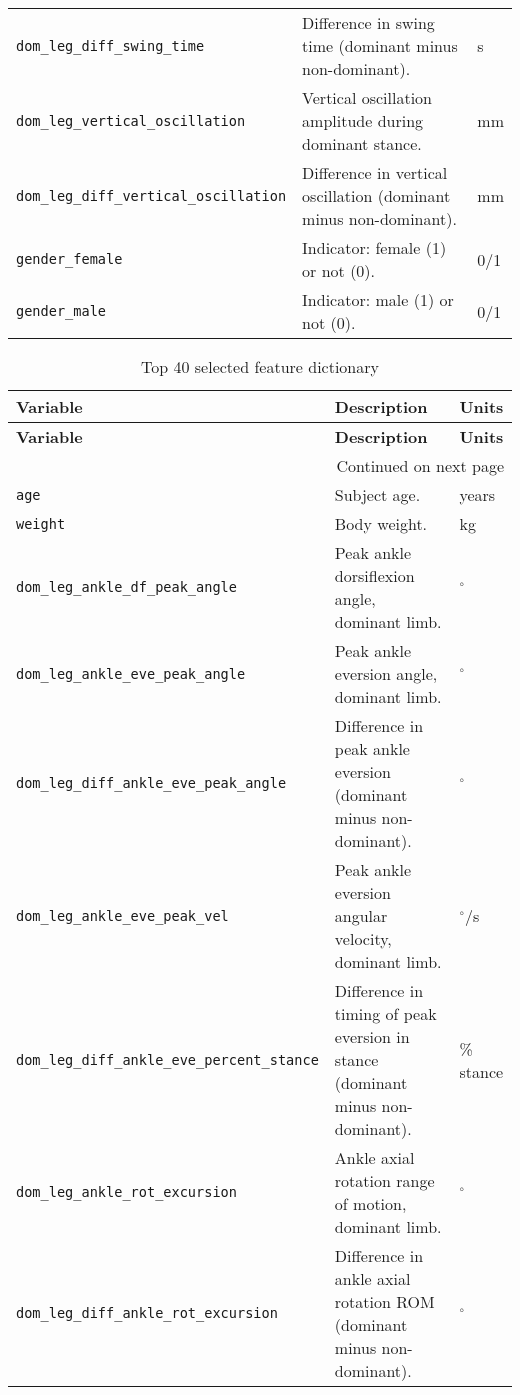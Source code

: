 \begin{longtable}{@{}l p{} l@{}}
    \texttt{dom\_leg\_diff\_swing\_time} & Difference in swing time (dominant minus non-dominant). & s \\
    \texttt{dom\_leg\_vertical\_oscillation} & Vertical oscillation amplitude during dominant stance. & mm \\
    \texttt{dom\_leg\_diff\_vertical\_oscillation} & Difference in vertical oscillation (dominant minus non-dominant). & mm \\
    \texttt{gender\_female} & Indicator: female (1) or not (0). & 0/1 \\
    \texttt{gender\_male} & Indicator: male (1) or not (0). & 0/1 \\
\end{longtable}


\begin{longtable}{@{}l p{} l@{}}
    \caption{Top 40 selected feature dictionary}\label{tab:top40_features}\\
    \toprule
    \textbf{Variable} & \textbf{Description} & \textbf{Units} \\
    \midrule
    \endfirsthead
    \toprule
    \textbf{Variable} & \textbf{Description} & \textbf{Units} \\
    \midrule
    \endhead
    \midrule
    \multicolumn{3}{r}{\small Continued on next page} \\
    \endfoot
    \bottomrule
    \endlastfoot
    \texttt{age} & Subject age. & years \\
    \texttt{weight} & Body weight. & kg \\
    \texttt{dom\_leg\_ankle\_df\_peak\_angle} & Peak ankle dorsiflexion angle, dominant limb. & $^\circ$ \\
    \texttt{dom\_leg\_ankle\_eve\_peak\_angle} & Peak ankle eversion angle, dominant limb. & $^\circ$ \\
    \texttt{dom\_leg\_diff\_ankle\_eve\_peak\_angle} & Difference in peak ankle eversion (dominant minus non-dominant). & $^\circ$ \\
    \texttt{dom\_leg\_ankle\_eve\_peak\_vel} & Peak ankle eversion angular velocity, dominant limb. & $^\circ$/s \\
    \texttt{dom\_leg\_diff\_ankle\_eve\_percent\_stance} & Difference in timing of peak eversion in stance (dominant minus non-dominant). & \% stance \\
    \texttt{dom\_leg\_ankle\_rot\_excursion} & Ankle axial rotation range of motion, dominant limb. & $^\circ$ \\
    \texttt{dom\_leg\_diff\_ankle\_rot\_excursion} & Difference in ankle axial rotation ROM (dominant minus non-dominant). & $^\circ$ \\

\end{longtable}
